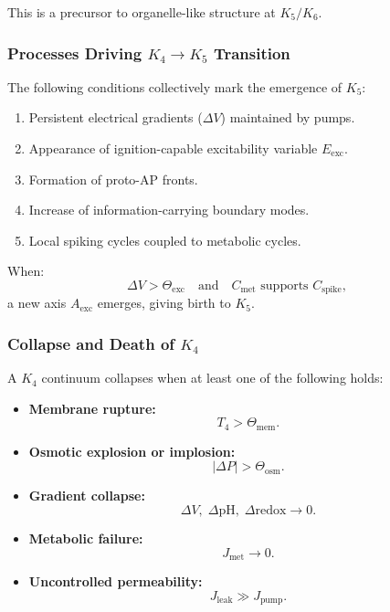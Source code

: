 This is a precursor to organelle-like structure at $K_5/K_6$.

\subsubsection{Processes Driving \texorpdfstring{$K_4 \to K_5$}{K_4 \to K_5} Transition}

The following conditions collectively mark the emergence of $K_5$:
\begin{enumerate}
    \item Persistent electrical gradients ($\Delta V$) maintained by pumps.
    \item Appearance of ignition-capable excitability variable
    $E_{\text{exc}}$.
    \item Formation of proto-AP fronts.
    \item Increase of information-carrying boundary modes.
    \item Local spiking cycles coupled to metabolic cycles.
\end{enumerate}

When:
\[
\Delta V > \Theta_{\text{exc}}
\quad\text{and}\quad
C_\text{met} \text{ supports } C_\text{spike},
\]
a new axis $A_{\text{exc}}$ emerges, giving birth to $K_5$.

\subsubsection{Collapse and Death of \texorpdfstring{$K_4$}{K_4}}

A $K_4$ continuum collapses when at least one of the following holds:

\begin{itemize}
    \item \textbf{Membrane rupture:}
    \[
    T_4 > \Theta_{\text{mem}}.
    \]
    \item \textbf{Osmotic explosion or implosion:}
    \[
    |\Delta P| > \Theta_{\text{osm}}.
    \]
    \item \textbf{Gradient collapse:}
    \[
    \Delta V,\; \Delta \text{pH},\; \Delta \text{redox} \to 0.
    \]
    \item \textbf{Metabolic failure:}
    \[
    J_{\text{met}} \to 0.
    \]
    \item \textbf{Uncontrolled permeability:}
    \[
    J_{\text{leak}} \gg J_{\text{pump}}.
    \]
\end{itemize}

